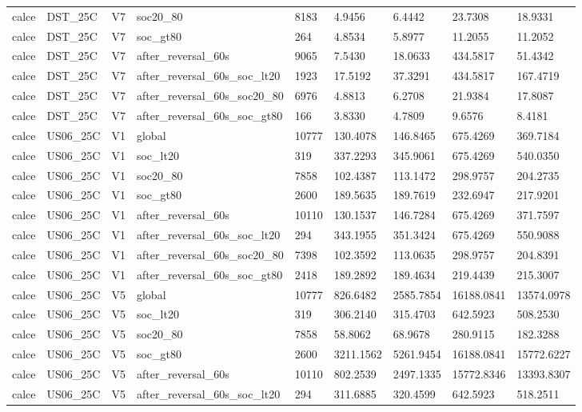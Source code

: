 \begin{tabular}{lllllllll}
calce & DST\_25C & V7 & soc20\_80 & 8183 & 4.9456 & 6.4442 & 23.7308 & 18.9331 \\
calce & DST\_25C & V7 & soc\_gt80 & 264 & 4.8534 & 5.8977 & 11.2055 & 11.2052 \\
calce & DST\_25C & V7 & after\_reversal\_60s & 9065 & 7.5430 & 18.0633 & 434.5817 & 51.4342 \\
calce & DST\_25C & V7 & after\_reversal\_60s\_soc\_lt20 & 1923 & 17.5192 & 37.3291 & 434.5817 & 167.4719 \\
calce & DST\_25C & V7 & after\_reversal\_60s\_soc20\_80 & 6976 & 4.8813 & 6.2708 & 21.9384 & 17.8087 \\
calce & DST\_25C & V7 & after\_reversal\_60s\_soc\_gt80 & 166 & 3.8330 & 4.7809 & 9.6576 & 8.4181 \\
calce & US06\_25C & V1 & global & 10777 & 130.4078 & 146.8465 & 675.4269 & 369.7184 \\
calce & US06\_25C & V1 & soc\_lt20 & 319 & 337.2293 & 345.9061 & 675.4269 & 540.0350 \\
calce & US06\_25C & V1 & soc20\_80 & 7858 & 102.4387 & 113.1472 & 298.9757 & 204.2735 \\
calce & US06\_25C & V1 & soc\_gt80 & 2600 & 189.5635 & 189.7619 & 232.6947 & 217.9201 \\
calce & US06\_25C & V1 & after\_reversal\_60s & 10110 & 130.1537 & 146.7284 & 675.4269 & 371.7597 \\
calce & US06\_25C & V1 & after\_reversal\_60s\_soc\_lt20 & 294 & 343.1955 & 351.3424 & 675.4269 & 550.9088 \\
calce & US06\_25C & V1 & after\_reversal\_60s\_soc20\_80 & 7398 & 102.3592 & 113.0635 & 298.9757 & 204.8391 \\
calce & US06\_25C & V1 & after\_reversal\_60s\_soc\_gt80 & 2418 & 189.2892 & 189.4634 & 219.4439 & 215.3007 \\
calce & US06\_25C & V5 & global & 10777 & 826.6482 & 2585.7854 & 16188.0841 & 13574.0978 \\
calce & US06\_25C & V5 & soc\_lt20 & 319 & 306.2140 & 315.4703 & 642.5923 & 508.2530 \\
calce & US06\_25C & V5 & soc20\_80 & 7858 & 58.8062 & 68.9678 & 280.9115 & 182.3288 \\
calce & US06\_25C & V5 & soc\_gt80 & 2600 & 3211.1562 & 5261.9454 & 16188.0841 & 15772.6227 \\
calce & US06\_25C & V5 & after\_reversal\_60s & 10110 & 802.2539 & 2497.1335 & 15772.8346 & 13393.8307 \\
calce & US06\_25C & V5 & after\_reversal\_60s\_soc\_lt20 & 294 & 311.6885 & 320.4599 & 642.5923 & 518.2511 \\

\end{tabular}
